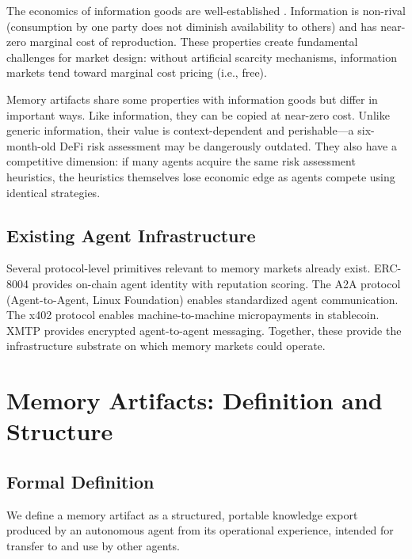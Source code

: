 \documentclass[11pt]{article}
\begin{document}
The economics of information goods are well-established \citep{arrow1962}. Information is non-rival (consumption by one party does not diminish availability to others) and has near-zero marginal cost of reproduction. These properties create fundamental challenges for market design: without artificial scarcity mechanisms, information markets tend toward marginal cost pricing (i.e., free).

Memory artifacts share some properties with information goods but differ in important ways. Like information, they can be copied at near-zero cost. Unlike generic information, their value is context-dependent and perishable---a six-month-old DeFi risk assessment may be dangerously outdated. They also have a competitive dimension: if many agents acquire the same risk assessment heuristics, the heuristics themselves lose economic edge as agents compete using identical strategies.

\subsection{Existing Agent Infrastructure}

Several protocol-level primitives relevant to memory markets already exist. ERC-8004 provides on-chain agent identity with reputation scoring. The A2A protocol (Agent-to-Agent, Linux Foundation) enables standardized agent communication. The x402 protocol enables machine-to-machine micropayments in stablecoin. XMTP provides encrypted agent-to-agent messaging. Together, these provide the infrastructure substrate on which memory markets could operate.

\section{Memory Artifacts: Definition and Structure}
\label{sec:artifacts}

\subsection{Formal Definition}

We define a memory artifact as a structured, portable knowledge export produced by an autonomous agent from its operational experience, intended for transfer to and use by other agents.
\end{document}
